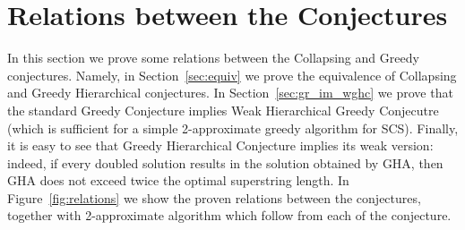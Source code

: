 \section{Relations between the Conjectures}
In this section we prove some relations between the Collapsing and Greedy conjectures. Namely, in Section~\ref{sec:equiv} we prove the equivalence of Collapsing and Greedy Hierarchical conjectures. In Section~\ref{sec:gr_im_wghc} we prove that the standard Greedy Conjecture implies Weak Hierarchical Greedy Conjecutre (which is sufficient for a simple 2-approximate greedy algorithm for SCS). Finally, it is easy to see that Greedy Hierarchical Conjecture implies its weak version: indeed, if every doubled solution results in the solution obtained by GHA, then GHA does not exceed twice the optimal superstring length. In Figure~\ref{fig:relations} we show the proven relations between the conjectures, together with 2-approximate algorithm which follow from each of the conjecture.
%
%
%
%
